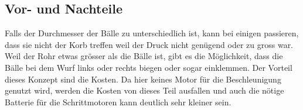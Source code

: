 \subsection{Vor- und Nachteile}
Falls der Durchmesser der Bälle zu unterschiedlich ist, kann bei einigen passieren, dass sie nicht der Korb treffen weil der Druck nicht genügend oder zu gross war. Weil der Rohr etwas grösser als die Bälle ist, gibt es die Möglichkeit, dass die Bälle bei dem Wurf links oder rechts biegen oder sogar einklemmen. Der Vorteil dieses Konzept sind die Kosten. Da hier keines Motor für die Beschleunigung genutzt wird, werden die Kosten von dieses Teil ausfallen und auch die nötige Batterie für die Schrittmotoren kann deutlich sehr kleiner sein.
